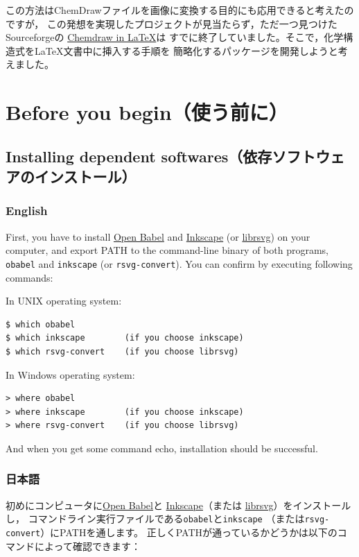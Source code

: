 \documentclass[dvipdfmx,12pt]{jsarticle}
\begin{document}
この方法はChemDrawファイルを画像に変換する目的にも応用できると考えたのですが，
この発想を実現したプロジェクトが見当たらず，ただ一つ見つけたSourceforgeの
\href{http://chemdrawinlatex.sourceforge.net/}{Chemdraw in \LaTeX}は
すでに終了していました。そこで，化学構造式を\LaTeX 文書中に挿入する手順を
簡略化するパッケージを開発しようと考えました。

\clearpage

\section{Before you begin（使う前に）}

\subsection{Installing dependent softwares（依存ソフトウェアのインストール）}

\subsubsection{English}

First, you have to install \href{http://openbabel.org/}{Open Babel} and
\href{https://inkscape.org/en/}{Inkscape}
(or \href{http://librsvg.sourceforge.net/download/}{librsvg}) on your
computer, and export PATH to the command-line binary of both programs,
\verb+obabel+ and \verb+inkscape+ (or \verb+rsvg-convert+).
You can confirm by executing following commands:

In UNIX operating system:
\begin{verbatim}
$ which obabel
$ which inkscape        (if you choose inkscape)
$ which rsvg-convert    (if you choose librsvg)
\end{verbatim}

In Windows operating system:
\begin{verbatim}
> where obabel
> where inkscape        (if you choose inkscape)
> where rsvg-convert    (if you choose librsvg)
\end{verbatim}

And when you get some command echo, installation should be successful.

\subsubsection{日本語}

初めにコンピュータに\href{http://openbabel.org/}{Open Babel}と
\href{https://inkscape.org/ja/}{Inkscape}（または
\href{http://librsvg.sourceforge.net/download/}{librsvg}）をインストールし，
コマンドライン実行ファイルである\verb+obabel+と\verb+inkscape+
（または\verb+rsvg-convert+）にPATHを通します。
正しくPATHが通っているかどうかは以下のコマンドによって確認できます：
\end{document}
